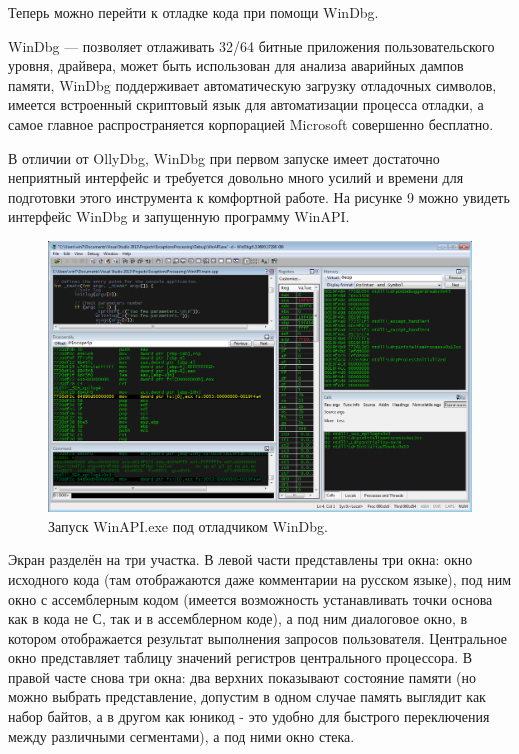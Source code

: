 \documentclass[a4paper, 12pt]{report}		%
\begin{document}
Теперь можно перейти к отладке кода при помощи WinDbg.

WinDbg — позволяет отлаживать 32/64 битные приложения пользовательского уровня, драйвера, может быть использован для анализа аварийных дампов памяти, WinDbg поддерживает автоматическую загрузку отладочных символов, имеется встроенный скриптовый язык для автоматизации процесса отладки, а самое главное распространяется корпорацией Microsoft совершенно бесплатно.

В отличии от OllyDbg, WinDbg при первом запуске имеет достаточно неприятный интерфейс и требуется довольно много усилий и времени для подготовки этого инструмента к комфортной работе. На рисунке 9 можно увидеть интерфейс WinDbg и запущенную программу WinAPI.

\begin{figure}[h!]
\centering
\includegraphics[scale=0.5]{res/002}
\caption{Запуск WinAPI.exe под отладчиком WinDbg.}
\end{figure}

Экран разделён на три участка. В левой части представлены три окна: окно исходного кода (там отображаются даже комментарии на русском языке), под ним окно с ассемблерным кодом (имеется возможность устанавливать точки основа как в кода не С, так и в ассемблерном коде), а под ним диалоговое окно, в котором отображается результат выполнения запросов пользователя. Центральное окно представляет таблицу значений регистров центрального процессора. В правой часте снова три окна: два верхних показывают состояние памяти (но можно выбрать представление, допустим в одном случае память выглядит как набор байтов, а в другом как юникод - это удобно для быстрого переключения между различными сегментами), а под ними окно стека.
\end{document}
